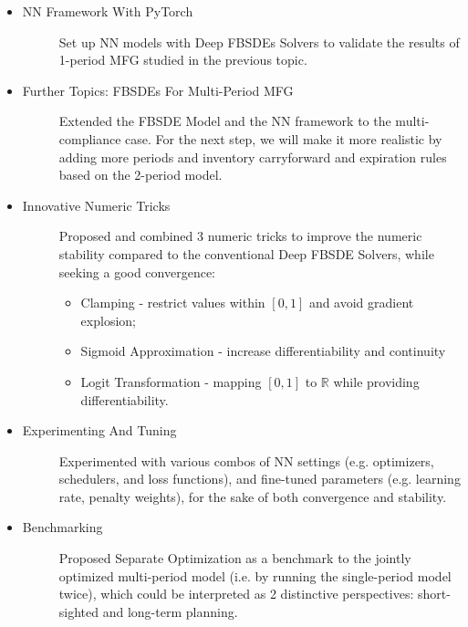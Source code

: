 \documentclass[a4paper]{article}
\begin{document}
\begin{itemize}
    \item\begin{description}
        \item[NN Framework With PyTorch] Set up NN models with Deep FBSDEs Solvers to validate the results of 1-period MFG studied in the previous topic.
    \end{description} 
    \item\begin{description}
        \item[Further Topics: FBSDEs For Multi-Period MFG] Extended the FBSDE Model and the NN framework to the multi-compliance case. For the next step, we will make it more realistic by adding more periods and inventory carryforward and expiration rules based on the 2-period model.
    \end{description} 
    \item\begin{description}
        \item[Innovative Numeric Tricks] Proposed and combined 3 numeric tricks to improve the numeric stability compared to the conventional Deep FBSDE Solvers, while seeking a good convergence:
        \begin{itemize}
            \item Clamping - restrict values within $[0,1]$ and avoid gradient explosion;
            \item Sigmoid Approximation - increase differentiability and continuity
            \item Logit Transformation - mapping $[0,1]$ to $\mathbb{R}$ while providing differentiability.
        \end{itemize}
    \end{description}
    \item\begin{description}
        \item[Experimenting And Tuning] Experimented with various combos of NN settings (e.g. optimizers, schedulers, and loss functions), and fine-tuned parameters (e.g. learning rate, penalty weights), for the sake of both convergence and stability. 
    \end{description}
    \item \begin{description}
        \item[Benchmarking] Proposed Separate Optimization as a benchmark to the jointly optimized multi-period model (i.e. by running the single-period model twice), which could be interpreted as 2 distinctive perspectives: short-sighted and long-term planning.

\end{description}
\end{itemize}
\end{document}
